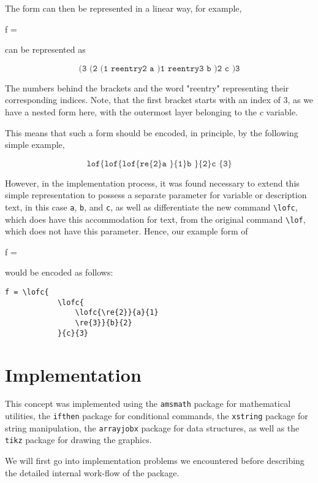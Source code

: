 \documentclass[12pt]{article}
\begin{document}
The form can then be represented in a linear way, for example,
\begin{lawofforms}
	f = 
\end{lawofforms}

can be represented as

$$\texttt{(3 (2 (1 reentry2 a )1 reentry3 b )2 c )3}$$

The numbers behind the brackets and the word "reentry" representing their corresponding indices. Note, that the first bracket starts with an index of 3, as we have a nested form here, with the outermost layer belonging to the $c$ variable.

This means that such a form should be encoded, in principle, by the following simple example,

$$\texttt{lof\{ lof\{ lof\{ re\{2\} a \}\{1\} b \}\{2\} c \{3\}}$$

However, in the implementation process, it was found necessary to extend this simple representation to possess a separate parameter for variable or description text, in this case \texttt{a}, \texttt{b}, and \texttt{c}, as well as differentiate the new command \texttt{\textbackslash lofc}, which does have this accommodation for text, from the original command \texttt{\textbackslash lof}, which does not have this parameter. Hence, our example form of \begin{lofinline}f = \end{lofinline} would be encoded as follows:

\newpage
\begin{lstlisting}
f = \lofc{
			\lofc{
				\lofc{\re{2}}{a}{1}
				\re{3}}{b}{2}
			}{c}{3}
\end{lstlisting}

\section{Implementation}\label{implementation}

This concept was implemented using the \texttt{amsmath}\cite{amsmath} package for mathematical utilities, the \texttt{ifthen}\cite{ifthen} package for conditional commands, the \texttt{xstring}\cite{xstring} package for string manipulation, the \texttt{arrayjobx}\cite{arrayjobx} package for data structures, as well as the \texttt{tikz}\cite{tikz} package for drawing the graphics.

We will first go into implementation problems we encountered before describing the detailed internal work-flow of the package.
\end{document}
